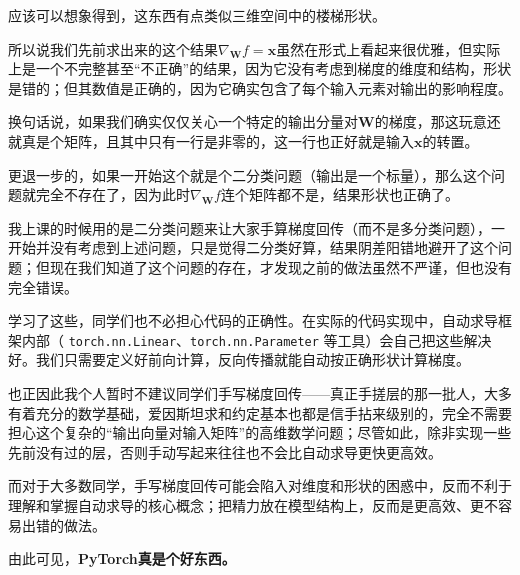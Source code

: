 \documentclass[
    UTF8,
    a4paper,
    12pt
]{ctexart}
\begin{document}
应该可以想象得到，这东西有点类似三维空间中的楼梯形状。

所以说我们先前求出来的这个结果$\nabla_\mathbf{W} f = \mathbf{x}$虽然在形式上看起来很优雅，但实际上是一个不完整甚至“不正确”的结果，因为它没有考虑到梯度的维度和结构，形状是错的；但其数值是正确的，因为它确实包含了每个输入元素对输出的影响程度。

换句话说，如果我们确实仅仅关心一个特定的输出分量对$\textbf{W}$的梯度，那这玩意还就真是个矩阵，且其中只有一行是非零的，这一行也正好就是输入$\mathbf{x}$的转置。

更退一步的，如果一开始这个就是个二分类问题（输出是一个标量），那么这个问题就完全不存在了，因为此时$\nabla_\mathbf{W} f$连个矩阵都不是，结果形状也正确了。

我上课的时候用的是二分类问题来让大家手算梯度回传（而不是多分类问题），一开始并没有考虑到上述问题，只是觉得二分类好算，结果阴差阳错地避开了这个问题；但现在我们知道了这个问题的存在，才发现之前的做法虽然不严谨，但也没有完全错误。

学习了这些，同学们也不必担心代码的正确性。在实际的代码实现中，自动求导框架内部（ \verb|torch.nn.Linear|、\verb|torch.nn.Parameter| 等工具）会自己把这些解决好。我们只需要定义好前向计算，反向传播就能自动按正确形状计算梯度。

也正因此我个人暂时不建议同学们手写梯度回传——真正手搓层的那一批人，大多有着充分的数学基础，爱因斯坦求和约定基本也都是信手拈来级别的，完全不需要担心这个复杂的“输出向量对输入矩阵”的高维数学问题；尽管如此，除非实现一些先前没有过的层，否则手动写起来往往也不会比自动求导更快更高效。

而对于大多数同学，手写梯度回传可能会陷入对维度和形状的困惑中，反而不利于理解和掌握自动求导的核心概念；把精力放在模型结构上，反而是更高效、更不容易出错的做法。

由此可见，\textbf{PyTorch真是个好东西。}
\end{document}
